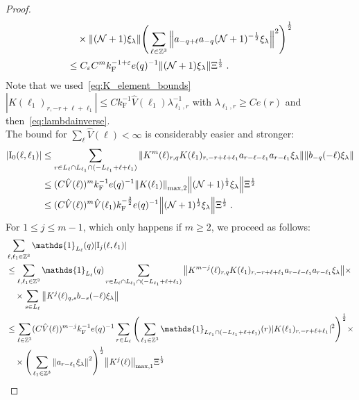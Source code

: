 \documentclass[12pt,a4paper]{article}
\numberwithin{equation}{section}
\newcommand{\1}{\mathbb{I}}
\newcommand{\F}{\mathrm{F}}
\newcommand{\I}{\mathrm{I}}
\newcommand{\Zstar}{\mathbb{Z}^3} %
\newcommand{\Z}{\mathbb{Z}}
\newcommand{\NN}{\mathcal{N}}
\newcommand{\half}{\frac{1}{2}}
\theoremstyle{plain}
\theoremstyle{definition}
\theoremstyle{remark}
\theoremstyle{plain}
\theoremstyle{definition}
\theoremstyle{remark}
\begin{document}
\begin{proof}
\begin{align}
	&\quad \times \norm{(\NN+1) \xi_\lambda}
		\Bigg( \sum_{\ell \in \Z^3} \norm{a_{-q+\ell} a_{-q} (\NN+1)^{-\half} \xi_\lambda}^2 \Bigg)^{\half} \nonumber\\
	&\leq C_\varepsilon C^m k_{\F}^{-1 + \varepsilon} e(q)^{-1}
		\norm{ (\NN+1) \xi_\lambda } \Xi^{\half} \;. \label{eq:estEQ2151_Coulomb}
\end{align}
Note that we used~\eqref{eq:K_element_bounds} $ |K(\ell_1)_{r,-r+\ell+\ell_1}| \le C k_{\F}^{-1} \hat{V}(\ell_1) \lambda_{\ell_1,r}^{-1} $ with $ \lambda_{\ell_1,r} \ge C e(r) $ and then~\eqref{eq:lambdainverse}.\\
The bound for $ \sum_{\ell} \hat{V}(\ell) < \infty $ is considerably easier and stronger:
\begin{align}
	|\I_0(\ell, \ell_1)|
	&\leq \sum_{r\in L_{\ell} \cap L_{\ell_1} \cap (-L_{\ell_1}+\ell+\ell_1)} \norm{K^m(\ell)_{r,q} K(\ell_1)_{r,-r+\ell+\ell_1} a_{r-\ell-\ell_1} a_{r-\ell_1} \xi_\lambda}\norm{ b_{-q}(-\ell) \xi_\lambda}\nonumber\\
	&\leq (C \hat{V}(\ell))^m k_{\F}^{-1} e(q)^{-1}
		\norm{K(\ell_1)}_{\max,2} \norm{ (\NN+1)^\half \xi_\lambda } \Xi^{\half} \nonumber\\
	&\leq (C \hat{V}(\ell))^m
		\hat{V}(\ell_1)
		k_{\F}^{-\frac 32} e(q)^{-1}
		\norm{ (\NN+1)^\half \xi_\lambda } \Xi^{\half} \;. \label{eq:estEQ2151}
\end{align}
For $ 1 \le j \le m-1 $, which only happens if $ m \ge 2 $, we proceed as follows:
\begin{align}
	&\sum_{\ell,\ell_1 \in \Zstar} \mathds{1}_{L_\ell}(q) |\I_j(\ell, \ell_1)| \nonumber\\
	&\leq \sum_{\ell,\ell_1 \in \Zstar} \mathds{1}_{L_\ell}(q) \sum\limits_{r\in L_{\ell} \cap L_{\ell_1} \cap (-L_{\ell_1}+\ell+\ell_1)}
		\norm{ K^{m-j}(\ell)_{r,q} K(\ell_1)_{r,-r+\ell+\ell_1} a_{r-\ell-\ell_1} a_{r-\ell_1} \xi_\lambda} \times \nonumber\\
	&\quad \times \sum\limits_{s \in L_{\ell}}
		\norm{ K^j(\ell)_{q,s} b_{-s}(-\ell) \xi_\lambda }\nonumber\\
	&\leq \sum_{\ell \in \Zstar} (C \hat{V}(\ell))^{m-j} k_{\F}^{-1} e(q)^{-1}
		\sum_{r \in L_\ell}
		\Bigg( \sum_{\ell_1 \in \Zstar} \mathds{1}_{L_{\ell_1} \cap (-L_{\ell_1}+\ell+\ell_1) }(r) |K(\ell_1)_{r,-r+\ell+\ell_1}|^2 \Bigg)^{\half} \times \nonumber\\
	&\quad \times \Bigg( \sum_{\ell_1 \in \Z^3} \norm{ a_{r-\ell_1} \xi_\lambda}^2 \Bigg)^{\half}
		\norm{K^j(\ell)}_{\max,1}
		\Xi^\half \nonumber\\

\end{align}
\end{proof}
\end{document}
